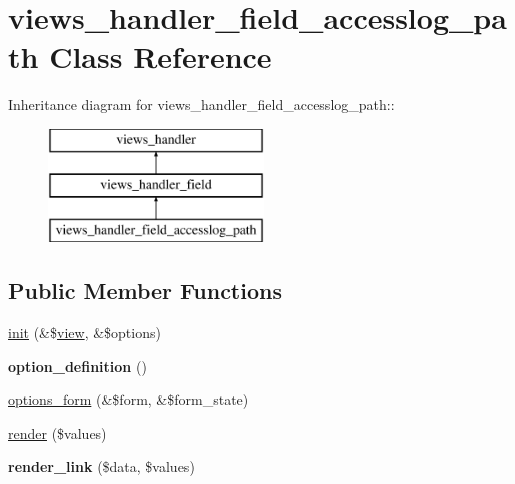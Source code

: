 \hypertarget{classviews__handler__field__accesslog__path}{
\section{views\_\-handler\_\-field\_\-accesslog\_\-path Class Reference}
\label{classviews__handler__field__accesslog__path}
}
Inheritance diagram for views\_\-handler\_\-field\_\-accesslog\_\-path::\begin{figure}[H]
\begin{center}
\leavevmode
\includegraphics[height=3cm]{classviews__handler__field__accesslog__path}
\end{center}
\end{figure}
\subsection*{Public Member Functions}
\begin{DoxyCompactItemize}
\item 
\hyperlink{classviews__handler__field__accesslog__path_a9f0e65ae8a7fbc2ef5986c3519da67b2}{init} (\&\$\hyperlink{classview}{view}, \&\$options)
\item 
\hypertarget{classviews__handler__field__accesslog__path_a11c091160e8e55c604aeb1241581f748}{
{\bfseries option\_\-definition} ()}
\label{classviews__handler__field__accesslog__path_a11c091160e8e55c604aeb1241581f748}

\item 
\hyperlink{classviews__handler__field__accesslog__path_ab8bfda464a205057cd730081aa5981c8}{options\_\-form} (\&\$form, \&\$form\_\-state)
\item 
\hyperlink{classviews__handler__field__accesslog__path_ab40b3461a6c122c052753537346089b1}{render} (\$values)
\item 
\hypertarget{classviews__handler__field__accesslog__path_a796634ec928797e80ddc6f3e67f21d71}{
{\bfseries render\_\-link} (\$data, \$values)}
\label{classviews__handler__field__accesslog__path_a796634ec928797e80ddc6f3e67f21d71}

\end{DoxyCompactItemize}


